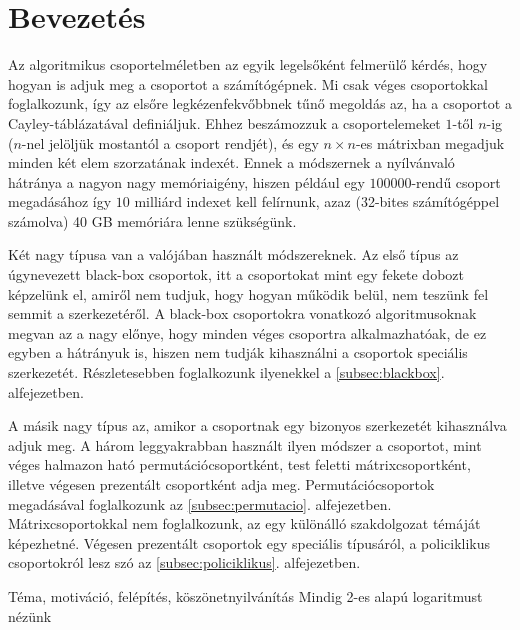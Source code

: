 \section*{Bevezetés}
\label{sec:bevezetes}
Az algoritmikus csoportelméletben az egyik legelsőként felmerülő kérdés, hogy hogyan is adjuk meg
a csoportot a számítógépnek.
Mi csak véges csoportokkal foglalkozunk, így az elsőre legkézenfekvőbbnek tűnő megoldás az, ha a
csoportot a Cayley-táblázatával definiáljuk.
Ehhez beszámozzuk a csoportelemeket $1$-től $n$-ig ($n$-nel jelöljük mostantól a csoport rendjét),
és egy $n\times n$-es mátrixban megadjuk minden két elem szorzatának indexét.
Ennek a módszernek a nyílvánvaló hátránya a nagyon nagy memóriaigény,
hiszen például egy $100000$-rendű csoport megadásához így $10$ milliárd indexet kell felírnunk,
azaz (32-bites számítógéppel számolva) 40 GB memóriára lenne szükségünk.

Két nagy típusa van a valójában használt módszereknek.
Az első típus az úgynevezett black-box csoportok, itt a csoportokat mint egy fekete dobozt képzelünk el,
amiről nem tudjuk, hogy hogyan működik belül, nem teszünk fel semmit a szerkezetéről.
A black-box csoportokra vonatkozó algoritmusoknak megvan az a nagy előnye, hogy minden véges csoportra
alkalmazhatóak, de ez egyben a hátrányuk is, hiszen nem tudják kihasználni a csoportok speciális szerkezetét.
Részletesebben foglalkozunk ilyenekkel a \ref{subsec:blackbox}. alfejezetben.

A másik nagy típus az, amikor a csoportnak egy bizonyos szerkezetét kihasználva adjuk meg.
A három leggyakrabban használt ilyen módszer a csoportot, mint véges halmazon ható permutációcsoportként,
test feletti mátrixcsoportként, illetve végesen prezentált csoportként adja meg.
Permutációcsoportok megadásával foglalkozunk az \ref{subsec:permutacio}. alfejezetben.
Mátrixcsoportokkal nem foglalkozunk, az egy különálló szakdolgozat témáját képezhetné.
Végesen prezentált csoportok egy speciális típusáról, a policiklikus csoportokról lesz szó
az \ref{subsec:policiklikus}. alfejezetben.


Téma, motiváció, felépítés, köszönetnyilvánítás
Mindig 2-es alapú logaritmust nézünk
